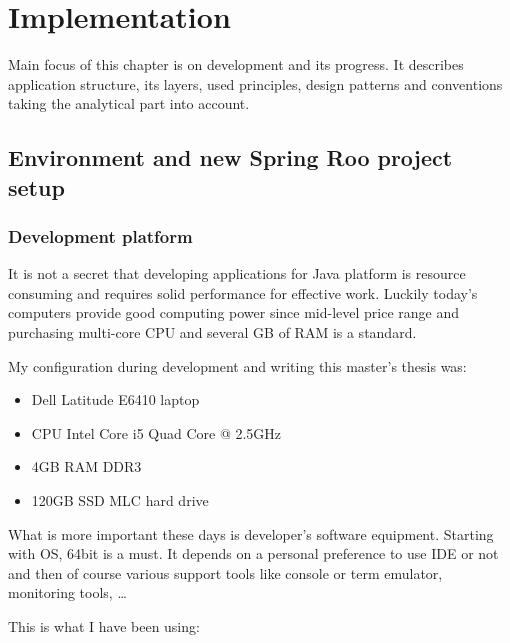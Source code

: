 \chapter{Implementation}\label{cha:implementation}

	Main focus of this chapter is on development and its progress. It describes application structure, its layers, used
	principles, design patterns and conventions taking the analytical part into account.

	\section{Environment and new Spring Roo project setup}
	
	\subsection{Development platform}\label{cha:implementation:platform}
	
	It is not a secret that developing applications for Java platform is resource consuming and requires solid performance
	for effective work. Luckily today's computers provide good computing power since mid-level price range and purchasing
	multi-core CPU and several GB of RAM is a standard.
	
	My configuration during development and writing this master's thesis was:
	
	\begin{itemize}
		\item Dell Latitude E6410 laptop
		\item CPU Intel Core i5 Quad Core @ 2.5GHz
		\item 4GB RAM DDR3
		\item 120GB SSD MLC hard drive 
	\end{itemize}
	
	What is more important these days is developer's software equipment. Starting with OS, 64bit is a must. It depends on
	a personal preference to use IDE or not and then of course various support tools like console or term emulator,
	monitoring tools, \ldots

	This is what I have been using:	

